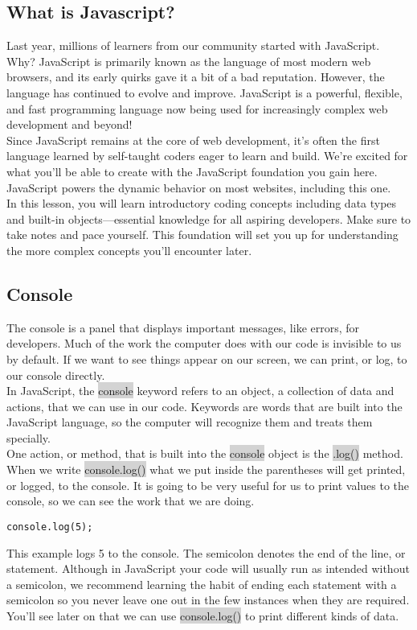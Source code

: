 \documentclass[11pt]{article}
\begin{document}
\subsection{What is Javascript? }
Last year, millions of learners from our community started with JavaScript. Why? JavaScript is primarily known as the language of most modern web browsers, and its early quirks gave it a bit of a bad reputation. However, the language has continued to evolve and improve. JavaScript is a powerful, flexible, and fast programming language now being used for increasingly complex web development and beyond! \\
\newline
Since JavaScript remains at the core of web development, it’s often the first language learned by self-taught coders eager to learn and build. We’re excited for what you’ll be able to create with the JavaScript foundation you gain here. JavaScript powers the dynamic behavior on most websites, including this one. \\
\newline
In this lesson, you will learn introductory coding concepts including data types and built-in objects—essential knowledge for all aspiring developers. Make sure to take notes and pace yourself. This foundation will set you up for understanding the more complex concepts you’ll encounter later. 
\subsection{Console}
The console is a panel that displays important messages, like errors, for developers. Much of the work the computer does with our code is invisible to us by default. If we want to see things appear on our screen, we can print, or log, to our console directly. \\
\newline
In JavaScript, the \colorbox{lightgray}{console} keyword refers to an object, a collection of data and actions, that we can use in our code. Keywords are words that are built into the JavaScript language, so the computer will recognize them and treats them specially. \\
\newline
One action, or method, that is built into the \colorbox{lightgray}{console} object is the \colorbox{lightgray}{.log()} method. When we write \colorbox{lightgray}{console.log()} what we put inside the parentheses will get printed, or logged, to the console. It is going to be very useful for us to print values to the console, so we can see the work that we are doing.
\begin{lstlisting}
console.log(5); 
\end{lstlisting}
This example logs 5 to the console. The semicolon denotes the end of the line, or statement. Although in JavaScript your code will usually run as intended without a semicolon, we recommend learning the habit of ending each statement with a semicolon so you never leave one out in the few instances when they are required. \\
\newline
You’ll see later on that we can use \colorbox{lightgray}{console.log()} to print different kinds of data.
\end{document}
